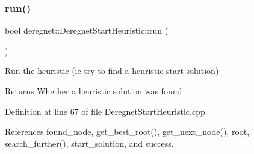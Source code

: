 \subsubsection{\texorpdfstring{run()}{run()}}
{\footnotesize\ttfamily bool deregnet\+::\+Deregnet\+Start\+Heuristic\+::run (\begin{DoxyParamCaption}{ }\end{DoxyParamCaption})}



Run the heuristic (ie try to find a heuristic start solution) 

\begin{DoxyReturn}{Returns}
Whether a heuristic solution was found 
\end{DoxyReturn}


Definition at line 67 of file Deregnet\+Start\+Heuristic.\+cpp.



References found\+\_\+node, get\+\_\+best\+\_\+root(), get\+\_\+next\+\_\+node(), root, search\+\_\+further(), start\+\_\+solution, and success.


